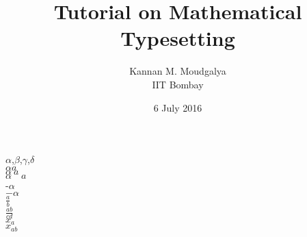 \documentclass[12pt,a5paper]{article}
\title{Tutorial on Mathematical Typesetting}
\author{Kannan M. Moudgalya \\ IIT Bombay}
\date{6 July 2016}
\begin{document}
\maketitle

$\alpha$,$\beta$,$\gamma$,$\delta$ \\

$\alpha a$ \\
$\alpha \ a$ \\
$\alpha \quad a$  \\

-$\alpha$ \\
$-\alpha$  \\

$\frac a b$ \\
$\frac{ab}{cd}$ \\

$x_a$ \\
$x_{ab}$ \\
\end{document}
